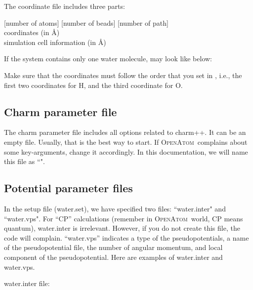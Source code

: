\documentclass[letterpaper,12pt]{article}
\newcommand{\openatom}{\textsc{OpenAtom}}
\begin{document}
The coordinate file includes three parts:

[number of atoms] [number of beads] [number of path]\\
coordinates (in \AA)\\
simulation cell information (in \AA)

If the system contains only one water molecule, {\selectfont{water.coords\_initial}} may look like below:

{\selectfont{
3 1 1\\
0.757 0.586 0.0\\
-0.757 0.586 0.0\\
0.000 0.000 0.0\\
10 0 0\\
0 10 0\\
0 0 10\\
}}

Make sure that the coordinates must follow the order that you set in {\selectfont{water.set}}, i.e., the first two coordinates for H, and the third coordinate for O. 

\subsection{Charm parameter file}

The charm parameter file includes all options related to charm++. It can be an empty file. Usually, that is the best way to start. If  \openatom \ complains about some key-arguments, change it accordingly. In this documentation, we will name this file as ``{\selectfont{cpaimd\_config}}".


\subsection{Potential parameter files}

In the setup file (water.set), we have specified two files: ``water.inter" and ``water.vps". For ``CP'' calculations (remember in \openatom \ world, CP means quantum), water.inter is irrelevant. However, if you do not create this file, the code will complain. ``water.vps'' indicates a type of the pseudopotentials, a name of the pseudopotential file, the number of angular momentum, and local component of the pseudopotential. Here are examples of water.inter and water.vps.

water.inter file:
\end{document}
